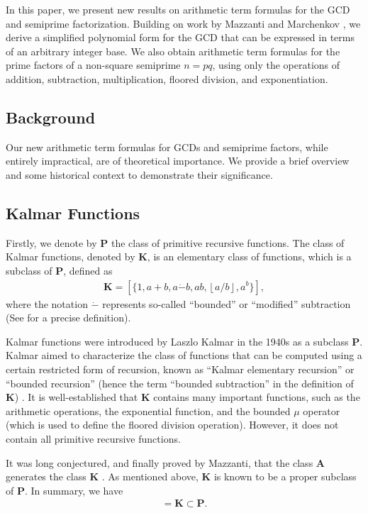 \documentclass[11pt,reqno]{article}
\theoremstyle{plain}
\theoremstyle{definition}
\newcommand{\floor}[1]{\left\lfloor #1 \right\rfloor}
\begin{document}
In this paper, we present new results on arithmetic term formulas for the GCD and semiprime factorization. Building on work by Mazzanti and Marchenkov \cite{mazzanti2002plainbases, marchenkov1980superposition}, we derive a simplified polynomial form for the GCD that can be expressed in terms of an arbitrary integer base. We also obtain arithmetic term formulas for the prime factors of a non-square semiprime $n=p q$, using only the operations of addition, subtraction, multiplication, floored division, and exponentiation.

\subsection{Background}
Our new arithmetic term formulas for GCDs and semiprime factors, while entirely impractical, are of theoretical importance. We provide a brief overview and some historical context to demonstrate their significance.

\subsection{Kalmar Functions} \label{subsection:kalmar}
Firstly, we denote by $\textbf{P}$ the class of primitive recursive functions. The class of Kalmar functions, denoted by $\textbf{K}$, is an elementary class of functions, which is a subclass of $\textbf{P}$, defined as
\begin{align*}
    \textbf{K} = [\{ 1, a+b, a\Dot{-}b, ab, \floor{a/b}, a^b \}],
\end{align*}
where the notation $\Dot{-}$ represents so-called ``bounded'' or ``modified'' subtraction (See \cite{mazzanti2002plainbases} for a precise definition).

Kalmar functions were introduced by Laszlo Kalmar in the 1940s as a subclass \textbf{P}. Kalmar aimed to characterize the class of functions that can be computed using a certain restricted form of recursion, known as ``Kalmar elementary recursion'' or ``bounded recursion'' (hence the term ``bounded subtraction'' in the definition of $\textbf{K}$) \cite{herman1969elementary}. It is well-established that $\textbf{K}$ contains many important functions, such as the arithmetic operations, the exponential function, and the bounded $\mu$ operator (which is used to define the floored division operation). However, it does not contain all primitive recursive functions.

It was long conjectured, and finally proved by Mazzanti, that the class $\textbf{A}$ generates the class $\textbf{K}$ \cite{mazzanti2002plainbases, marchenkov2007superposition}. As mentioned above, $\textbf{K}$ is known to be a proper subclass of $\textbf{P}$. In summary, we have
\begin{align*}
    [\textbf{A}] = \textbf{K} \subset \textbf{P} .
\end{align*}
\end{document}
